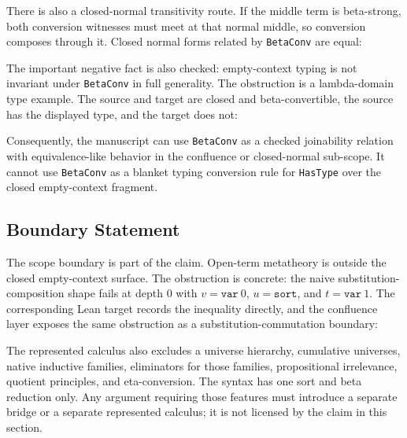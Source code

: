 There is also a closed-normal transitivity route.  If the middle term is
beta-strong, both conversion witnesses must meet at that normal middle, so
conversion composes through it.  Closed normal forms related by
\texttt{BetaConv} are equal:


The important negative fact is also checked: empty-context typing is not
invariant under \texttt{BetaConv} in full generality.  The obstruction is a
lambda-domain type example.  The source and target are closed and
beta-convertible, the source has the displayed type, and the target does not:


Consequently, the manuscript can use \texttt{BetaConv} as a checked
joinability relation with equivalence-like behavior in the confluence or
closed-normal sub-scope.  It cannot use \texttt{BetaConv} as a blanket typing
conversion rule for \texttt{HasType} over the closed empty-context fragment.

\subsection{Boundary Statement}
\label{subsec:session-metatheory-boundary}

The scope boundary is part of the claim.  Open-term metatheory is outside the
closed empty-context surface.  The obstruction is concrete: the naive
substitution-composition shape fails at depth $0$ with
$v = \texttt{var}\ 0$, $u = \texttt{sort}$, and $t = \texttt{var}\ 1$.
The corresponding Lean target records the inequality directly, and the
confluence layer exposes the same obstruction as a substitution-commutation
boundary:


The represented calculus also excludes a universe hierarchy, cumulative
universes, native inductive families, eliminators for those families,
propositional irrelevance, quotient principles, and eta-conversion.  The
syntax has one sort and beta reduction only.  Any argument requiring those
features must introduce a separate bridge or a separate represented calculus;
it is not licensed by the claim in this section.

